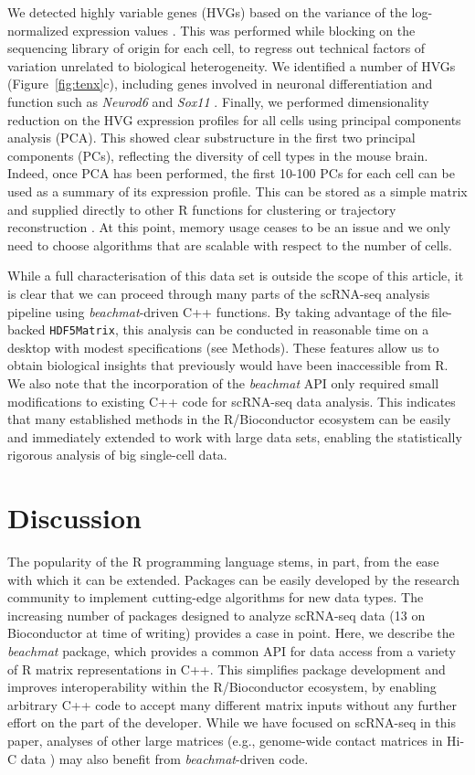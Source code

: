 \documentclass[10pt,letterpaper]{article}
\newcommand{\beachmat}{\textit{beachmat}}
\newcommand{\code}[1]{\texttt{#1}}
\begin{document}
We detected highly variable genes (HVGs) based on the variance of the log-normalized expression values \cite{lun2016stepbystep}.
This was performed while blocking on the sequencing library of origin for each cell, to regress out technical factors of variation unrelated to biological heterogeneity.
We identified a number of HVGs (Figure~\ref{fig:tenx}c), including genes involved in neuronal differentiation and function such as \textit{Neurod6} \cite{ kay2011neurod6} and \textit{Sox11} \cite{bergsland2006establishment}. 
Finally, we performed dimensionality reduction on the HVG expression profiles for all cells using principal components analysis (PCA).
This showed clear substructure in the first two principal components (PCs), reflecting the diversity of cell types in the mouse brain.
Indeed, once PCA has been performed, the first 10-100 PCs for each cell can be used as a summary of its expression profile.
This can be stored as a simple matrix and supplied directly to other R functions for clustering \cite{xu2015identification,csardi2006igraph} or trajectory reconstruction \cite{trapnell2014dynamics}.
At this point, memory usage ceases to be an issue and we only need to choose algorithms that are scalable with respect to the number of cells.

While a full characterisation of this data set is outside the scope of this article, it is clear that we can proceed through many parts of the scRNA-seq analysis pipeline using \beachmat{}-driven C++ functions.
By taking advantage of the file-backed \code{HDF5Matrix}, this analysis can be conducted in reasonable time on a desktop with modest specifications (see Methods).
These features allow us to obtain biological insights that previously would have been inaccessible from R.
We also note that the incorporation of the \beachmat{} API only required small modifications to existing C++ code for scRNA-seq data analysis.
This indicates that many established methods in the R/Bioconductor ecosystem can be easily and immediately extended to work with large data sets,
enabling the statistically rigorous analysis of big single-cell data.

\section*{Discussion}
The popularity of the R programming language stems, in part, from the ease with which it can be extended.
Packages can be easily developed by the research community to implement cutting-edge algorithms for new data types.
The increasing number of packages designed to analyze scRNA-seq data (13 on Bioconductor at time of writing) provides a case in point.
Here, we describe the \beachmat{} package, which provides a common API for data access from a variety of R matrix representations in C++.
This simplifies package development and improves interoperability within the R/Bioconductor ecosystem, by enabling arbitrary C++ code to accept many different matrix inputs without any further effort on the part of the developer.
While we have focused on scRNA-seq in this paper, analyses of other large matrices (e.g., genome-wide contact matrices in Hi-C data \cite{lun2016infrastructure}) may also benefit from \beachmat{}-driven code.
\end{document}
